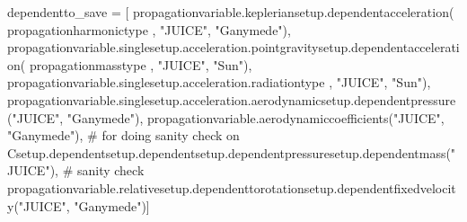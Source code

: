 {}
\markdownRendererSectionEnd \markdownRendererSectionBegin
{}\markdownRendererInterblockSeparator
{}dependentto_save = [ propagationvariable.kepleriansetup.dependentacceleration( propagationharmonictype , "JUICE", "Ganymede"), propagationvariable.singlesetup.acceleration.pointgravitysetup.dependentacceleration( propagationmasstype , "JUICE", "Sun"), propagationvariable.singlesetup.acceleration.radiationtype , "JUICE", "Sun"), propagationvariable.singlesetup.acceleration.aerodynamicsetup.dependentpressure("JUICE", "Ganymede"), propagationvariable.aerodynamiccoefficients("JUICE", "Ganymede"), # for doing sanity check on Csetup.dependentsetup.dependentsetup.dependentpressuresetup.dependentmass("JUICE"), # sanity check propagationvariable.relativesetup.dependenttorotationsetup.dependentfixedvelocity("JUICE", "Ganymede")]\markdownRendererInterblockSeparator
{}
